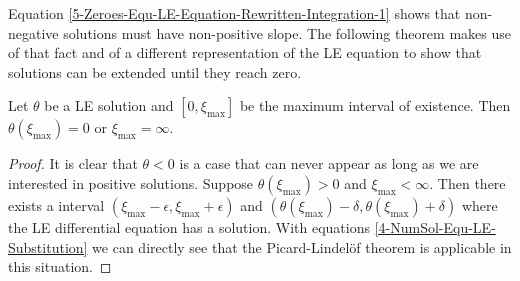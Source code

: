 Equation \eqref{5-Zeroes-Equ-LE-Equation-Rewritten-Integration-1} shows that non-negative solutions must have non-positive slope.
The following theorem makes use of that fact and of a different representation of the \ac{LE} equation to show that solutions can be extended until they reach zero.
\begin{lemma}
	Let $\theta$ be a \ac{LE} solution and $[0,\xi_\textrm{max}]$ be the maximum interval of existence.
	Then $\theta(\xi_\textrm{max})=0$ or $\xi_\textrm{max}=\infty$.
\end{lemma}
\begin{proof}
	It is clear that $\theta<0$ is a case that can never appear as long as we are interested in positive solutions.
	Suppose $\theta(\xi_\textrm{max})>0$ and $\xi_\textrm{max}<\infty$.
	Then there exists a interval $(\xi_\textrm{max}-\epsilon,\xi_\textrm{max}+\epsilon)$ and $(\theta(\xi_\textrm{max})-\delta,\theta(\xi_\textrm{max})+\delta)$ where the \ac{LE} differential equation has a solution.
	With equations \ref{4-NumSol-Equ-LE-Substitution} we can directly see that the Picard-Lindelöf theorem \cite{ernestApplicationMethodeApproximations1894} is applicable in this situation.
\end{proof}
%
%
%
